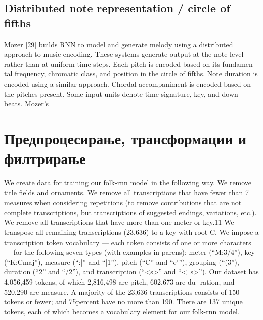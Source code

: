 \subsection{Distributed note representation / circle of fifths}

Mozer [29] builds RNN to model and generate melody using a distributed
approach to music encoding. These systems generate output at the note level rather than at uniform time steps. Each pitch is encoded based on its fundamen- tal frequency, chromatic class, and position in the circle of fifths. Note duration is encoded using a similar approach. Chordal accompaniment is encoded based on the pitches present. Some input units denote time signature, key, and down-
beats. Mozer’s

\section{Предпроцесирање, трансформации и филтрирање}

\cite{Sturm2016} We create data for training our folk-rnn model in the following way. We
remove title fields and ornaments. We remove all transcriptions that have fewer than 7 measures when considering repetitions (to remove contributions that are not complete transcriptions, but transcriptions of suggested endings, variations, etc.). We remove all transcriptions that have more than one meter or key.11 We transpose all remaining transcriptions (23,636) to a key with root C.
We impose a transcription token vocabulary — each token consists of one or more characters — for the following seven types (with examples in parens): meter (“M:3/4”), key (“K:Cmaj”), measure (“:|” and “|1”), pitch (“C” and “c’”),
grouping (“(3”), duration (“2” and “/2”), and transcription (“<s>” and “<\ s>”). 
Our dataset has 4,056,459 tokens, of which 2,816,498 are pitch, 602,673 are du- ration, and 520,290 are measure. A majority of the 23,636 transcriptions consists of 150 tokens or fewer; and 75percent have no more than 190. There are 137 unique tokens, each of which becomes a vocabulary element for our folk-rnn model.

